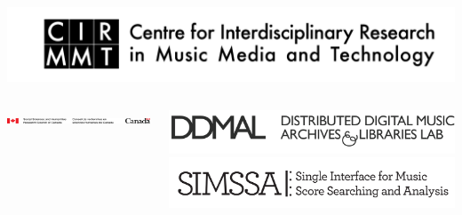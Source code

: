 \documentclass[final]{beamer}
\newlength{\onecolwid}
\newcommand{\blockSpace}{\vskip 0.75ex}
\begin{document}
\begin{frame}[fragile,t]
\begin{columns}
\begin{column}{\onecolwid}
\begin{block}{}
\centering
{}
\hspace{1.2cm} 
\hspace{1.2cm} 
\includegraphics[scale=0.35]{images/CIRMMT_logo}
\end{block}
\end{column}
\end{columns}

\vspace{-5cm}

\begin{columns}
\begin{column}{\onecolwid}
\begin{block}{}
\centering
\includegraphics[scale=2.1]{images/SSHRC_logo}
\end{block}
\end{column}
\begin{column}{\onecolwid}
\begin{block}{}
\centering
\includegraphics[scale=0.45]{images/ddmal_logo_large}
\includegraphics[scale=1.25]{images/SIMSSA_logo}
\end{block}
\end{column}
\end{columns}
\end{frame}
\end{document}
